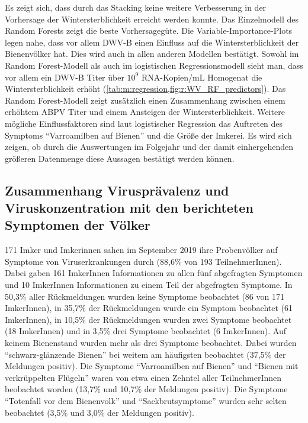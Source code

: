 
 
 Es zeigt sich, dass durch das Stacking keine weitere Verbesserung in der Vorhersage der Wintersterblichkeit erreicht werden konnte. Das Einzelmodell des Random Forests zeigt die beste Vorhersagegüte. Die Variable-Importance-Plots legen nahe, dass vor allem DWV-B einen Einfluss auf die Wintersterblichkeit der Bienenvölker hat. Dies wird auch in allen anderen Modellen bestätigt. Sowohl im Random Forest-Modell als auch im logistischen Regressionsmodell sieht man, dass vor allem ein DWV-B Titer über $10^9$ RNA-Kopien/\si{\milli\liter} Homogenat die Wintersterblichkeit erhöht (\cref{tab:m:regression,fig:r:WV_RF_predictors}). Das Random Forest-Modell zeigt zusätzlich einen Zusammenhang zwischen einem erhöhtem ABPV Titer und einem Ansteigen der Wintersterblichkeit. Weitere mögliche Einflussfaktoren sind laut logistischer Regression das Auftreten des Symptoms \enquote{Varroamilben auf Bienen} und die Größe der Imkerei. Es wird sich zeigen, ob durch die Auswertungen im Folgejahr und der damit einhergehenden größeren Datenmenge diese Aussagen bestätigt werden können.
 
 
\subsection{Zusammenhang Virusprävalenz und Viruskonzentration mit den berichteten Symptomen der Völker} \label{chap:egebnisse:symptome}

171 Imker und Imkerinnen sahen im September 2019 ihre Probenvölker auf Symptome von Viruserkrankungen durch (88,6\% von 193 TeilnehmerInnen). Dabei gaben 161 ImkerInnen Informationen zu allen fünf abgefragten Symptomen und 10 ImkerInnen Informationen zu einem Teil der abgefragten Symptome. In 50,3\% aller Rückmeldungen wurden keine Symptome beobachtet (86 von 171 ImkerInnen), in 35,7\% der Rückmeldungen wurde ein Symptom beobachtet (61 ImkerInnen), in 10,5\% der Rückmeldungen wurden zwei Symptome beobachtet (18 ImkerInnen) und in 3,5\% drei Symptome beobachtet (6 ImkerInnen). Auf keinem Bienenstand wurden mehr als drei Symptome beobachtet.
Dabei wurden \enquote{schwarz-glänzende Bienen} bei weitem am häufigsten beobachtet (37,5\% der Meldungen positiv). Die Symptome \enquote{Varroamilben auf Bienen} und \enquote{Bienen mit verkrüppelten Flügeln} waren von etwa einen Zehntel aller TeilnehmerInnen beobachtet worden (13,7\% und 10,7\% der Meldungen positiv). Die Symptome \enquote{Totenfall vor dem Bienenvolk} und \enquote{Sackbrutsymptome} wurden sehr selten beobachtet (3,5\% und 3,0\% der Meldungen positiv).

